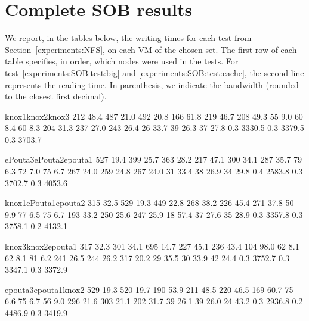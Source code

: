 \section{Complete SOB results}
\label{appendix:SOB}

We report, in the tables below, the writing times for each test from
Section~\ref{experiments:NFS}, on each VM of the chosen set.
%
The first row of each table specifies, in order, which nodes were used
in the tests.
%
For test~\ref{experiments:SOB:test:big} and
\ref{experiments:SOB:test:cache}, the second line represents the
reading time. In parenthesis, we indicate the bandwidth (rounded to
the closest first decimal).%

\noindent%
\resultpartition%
{{knox1}{knox2}{knox3}}%
{{ 212 }{ 48.4   }{ 487 }{ 21.0   }{ 492 }{ 20.8   }}%
{{ 166 }{ 61.8   }{ 219 }{ 46.7   }{ 208 }{ 49.3   }}%
{{  55 }{ 9.0    }{  60 }{ 8.4    }{  60 }{ 8.3    }}%
{{ 204 }{ 31.3   }{ 237 }{ 27.0   }{ 243 }{ 26.4   }}%
{{  26 }{ 33.7   }{  39 }{ 26.3   }{  37 }{ 27.8   }}%
{{ 0.3 }{ 3330.5 }{ 0.3 }{ 3379.5 }{ 0.3 }{ 3703.7 }}

\noindent%
\resultpartition%
{{ePouta3}{ePouta2}{epouta1}}%
{{ 527 }{ 19.4   }{ 399 }{ 25.7   }{ 363 }{ 28.2   }}%
{{ 217 }{ 47.1   }{ 300 }{ 34.1   }{ 287 }{ 35.7   }}%
{{  79 }{ 6.3    }{  72 }{ 7.0    }{  75 }{ 6.7    }}%
{{ 267 }{ 24.0   }{ 259 }{ 24.8   }{ 267 }{ 24.0   }}%
{{  31 }{ 33.4   }{  38 }{ 26.9   }{  34 }{ 29.8   }}%
{{ 0.4 }{ 2583.8 }{ 0.3 }{ 3702.7 }{ 0.3 }{ 4053.6 }}

\noindent%
\resultpartition%
{{knox1}{ePouta1}{epouta2}}%
{{ 315 }{ 32.5   }{ 529 }{ 19.3   }{ 449 }{ 22.8   }}%
{{ 268 }{ 38.2   }{ 226 }{ 45.4   }{ 271 }{ 37.8   }}%
{{  50 }{ 9.9    }{  77 }{ 6.5    }{  75 }{ 6.7    }}%
{{ 193 }{ 33.2   }{ 250 }{ 25.6   }{ 247 }{ 25.9   }}%
{{  18 }{ 57.4   }{  37 }{ 27.6   }{  35 }{ 28.9   }}%
{{ 0.3 }{ 3357.8 }{ 0.3 }{ 3758.1 }{ 0.2 }{ 4132.1 }}

\noindent%
\resultpartition%
{{knox3}{knox2}{epouta1}}%
{{ 317 }{ 32.3   }{ 301 }{ 34.1   }{ 695 }{ 14.7   }}%
{{ 227 }{ 45.1   }{ 236 }{ 43.4   }{ 104 }{ 98.0   }}%
{{  62 }{  8.1   }{  62 }{  8.1   }{  81 }{  6.2   }}%
{{ 241 }{ 26.5   }{ 244 }{ 26.2   }{ 317 }{ 20.2   }}%
{{  29 }{ 35.5   }{  30 }{ 33.9   }{  42 }{ 24.4   }}%
{{ 0.3 }{ 3752.7 }{ 0.3 }{ 3347.1 }{ 0.3 }{ 3372.9 }}

\noindent%
\resultpartition%
{{epouta3}{epouta1}{knox2}}%
{{ 529 }{ 19.3   }{ 520 }{ 19.7   }{ 190 }{ 53.9   }}%
{{ 211 }{ 48.5   }{ 220 }{ 46.5   }{ 169 }{ 60.7   }}%
{{  75 }{  6.6   }{  75 }{  6.7   }{  56 }{  9.0   }}%
{{ 296 }{ 21.6   }{ 303 }{ 21.1   }{ 202 }{ 31.7   }}%
{{  39 }{ 26.1   }{  39 }{ 26.0   }{  24 }{ 43.2   }}%
{{ 0.3 }{ 2936.8 }{ 0.2 }{ 4486.9 }{ 0.3 }{ 3419.9 }}


